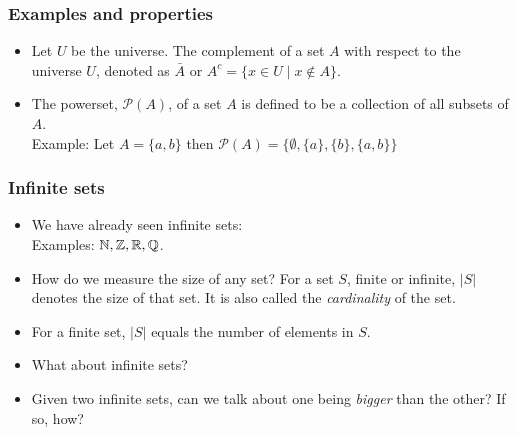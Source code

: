  \begin{frame}[fragile]
\frametitle{Examples and properties}
\begin{itemize}

\item Let $U$ be the universe. The complement of a set $A$ with respect to the universe $U$, denoted as $\bar{A}$ or $A^c = \{x \in U \mid x \notin A\}$.

\item The powerset, $\mathcal{P}(A)$, of a set $A$ is defined to be a collection of all subsets of $A$. \\


Example: Let $A = \{a,b\}$ then $\mathcal{P}(A) = \{ \emptyset, \{a\}, \{b\}, \{a,b\}\}$


\end{itemize}

\end{frame}


 \begin{frame}[fragile]
\frametitle{Infinite sets}
\begin{itemize}
\item We have already seen infinite sets:\\
Examples: ${{\mathbb{N}}}, {{\mathbb{Z}}}, {{\mathbb{R}}}, {{\mathbb{Q}}}$.

\item How do we measure the size of any set? For a set $S$, finite or infinite, $|S|$ denotes the size
of that set. It is also called the {\it cardinality} of the set.

\item For a finite set, $|S|$ equals the number of elements in $S$.

\item What about infinite sets?

\item Given two infinite sets, can we talk about one being {\it bigger} than the other? If so, how?
\end{itemize}
\end{frame}

